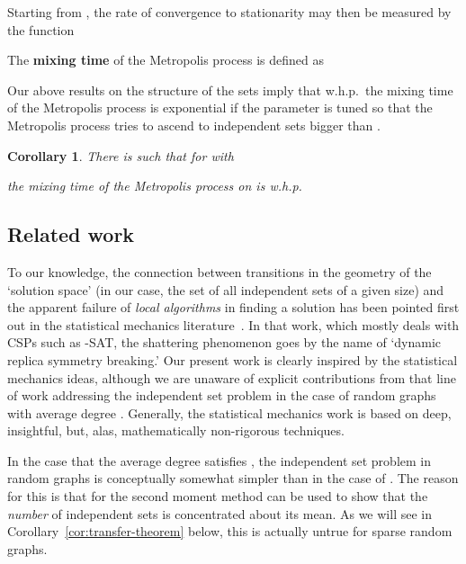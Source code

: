\documentclass[a4paper,10pt]{article}
\newtheorem{corollary}{Corollary}\renewcommand{\thecorollary}{\arabic{corollary}}
\newcommand{\whp}{w.h.p.}
\newcommand\Cor{Corollary}
\begin{document}
Starting from , the rate of convergence to stationarity may then be measured by the function


\noindent
The {\bf mixing time} of the Metropolis process  is defined as



Our above results on the structure of the sets 
imply that \whp\ the mixing time of the Metropolis process is
exponential if the parameter  is tuned so that the
Metropolis process tries to ascend to independent sets bigger
than .

\begin{corollary}\label{cor:MixingTimeBound}
There is  such that for  with

the mixing time of the Metropolis process on  is
 \whp
\end{corollary}




\subsection{Related work}
To our knowledge, the connection between transitions in the geometry
of the `solution space' (in our case, the set of all independent sets of a given size)
and the  apparent failure of {\em local algorithms}
in finding a solution has been pointed first out in the statistical mechanics 
literature~\cite{FuAnderson,MPZ-Science,1RSBPaper}.
In that work, which mostly deals with CSPs such as -SAT,
the shattering phenomenon goes by the name of `dynamic replica symmetry breaking.'
Our present work is clearly inspired by the statistical mechanics ideas,
although we are unaware of explicit contributions from that line of work addressing the
independent set problem in the case of random graphs with average degree .
Generally, the statistical mechanics work is based on deep, insightful, but, alas, 
mathematically non-rigorous techniques.



In the case that the average degree  satisfies ,
the independent set problem in random graphs is conceptually
somewhat simpler than in the case of .
The reason for this is that for 
the second moment method can be used to show that the \emph{number}
of independent sets is concentrated about its mean. As we will see
in \Cor~\ref{cor:transfer-theorem} below, this is actually untrue for
sparse random graphs.
\end{document}

